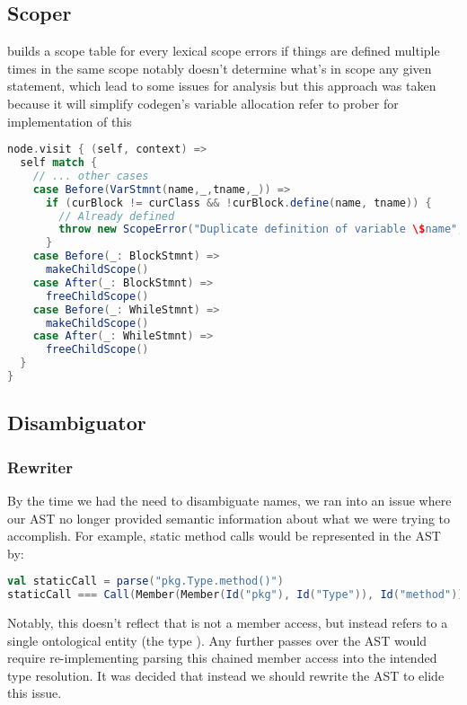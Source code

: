 \documentclass{article}
\begin{document}




\subsection{Scoper}
builds a scope table for every lexical scope
errors if things are defined multiple times in the same scope
notably doesn't determine what's in scope any given statement, which lead to some issues for analysis
but this approach was taken because it will simplify codegen's variable allocation
    refer to prober for implementation of this


\begin{lstlisting}[language=Scala]
node.visit { (self, context) =>
  self match {
    // ... other cases
    case Before(VarStmnt(name,_,tname,_)) =>
      if (curBlock != curClass && !curBlock.define(name, tname)) {
        // Already defined
        throw new ScopeError("Duplicate definition of variable \$name", self.from)
      }
    case Before(_: BlockStmnt) =>
      makeChildScope()
    case After(_: BlockStmnt) =>
      freeChildScope()
    case Before(_: WhileStmnt) =>
      makeChildScope()
    case After(_: WhileStmnt) =>
      freeChildScope()
  }
}
\end{lstlisting}



\subsection{Disambiguator}
\subsubsection{Rewriter}
By the time we had the need to disambiguate names, we ran into an issue where our AST no longer provided semantic
information about what we were trying to accomplish. For example, static method calls would be represented in the AST
by:

\begin{lstlisting}[language=Scala]
val staticCall = parse("pkg.Type.method()")
staticCall === Call(Member(Member(Id("pkg"), Id("Type")), Id("method")))
\end{lstlisting}

Notably, this doesn't reflect that  is not a member access, but instead refers to a single ontological
entity (the type ). Any further passes over the AST would require re-implementing parsing this chained
member access into the intended type resolution. It was decided that instead we should rewrite the AST to elide this
issue.
\end{document}
